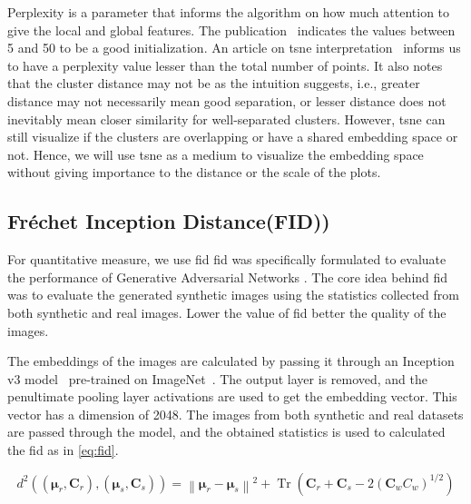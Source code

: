 Perplexity is a parameter that informs the algorithm on how much attention to give the local and global features.
The publication~\cite{vanDerMaaten2008} indicates the values between 5 and 50 to be a good initialization.
An article on \gls{tsne} interpretation~\cite{wattenberg2016how} informs us to have a perplexity value lesser than the total number of points.
It also notes that the cluster distance may not be as the intuition suggests, i.e., greater distance may not necessarily mean good separation, or lesser distance does not inevitably mean closer similarity for well-separated clusters.
However, \gls{tsne} can still visualize if the clusters are overlapping or have a shared embedding space or not.
Hence, we will use \gls{tsne} as a medium to visualize the embedding space without giving importance to the distance or the scale of the plots.

\subsection{Fr\'echet Inception Distance(FID))}\label{subsec:fr'echet-inception-distance)}
For quantitative measure, we use \gls{fid}
\gls{fid} \cite{Heusel2017GANsTB} was specifically formulated to evaluate the performance of Generative Adversarial Networks \cite{Goodfellow2014GenerativeAN}.
The core idea behind \gls{fid} was to evaluate the generated synthetic images using the statistics collected from both synthetic and real images.
Lower the value of \gls{fid} better the quality of the images.

The embeddings of the images are calculated by passing it through an Inception v3 model~\cite{Szegedy2016RethinkingTI} pre-trained on ImageNet~\cite{Deng2009ImageNetAL}.
The output layer is removed, and the penultimate pooling layer activations are used to get the embedding vector.
This vector has a dimension of 2048.
The images from both synthetic and real datasets are passed through the model, and the obtained statistics is used to calculated the \gls{fid} as in \autoref{eq:fid}.

\begin{equation}
    d^{2}\left((\boldsymbol{\mu}_{r}, \boldsymbol{C}_{r}),\left(\boldsymbol{\mu}_{s}, \boldsymbol{C}_{s}\right)\right)=\left\|\boldsymbol{\mu}_{r}-\boldsymbol{\mu}_{s}\right\|^{2}+\operatorname{Tr}\left(\boldsymbol{C}_{r}+\boldsymbol{C}_{s}-2\left(\boldsymbol{C}_{w} {C}_{w}\right)^{1 / 2}\right)
    \label{eq:fid}
\end{equation}

